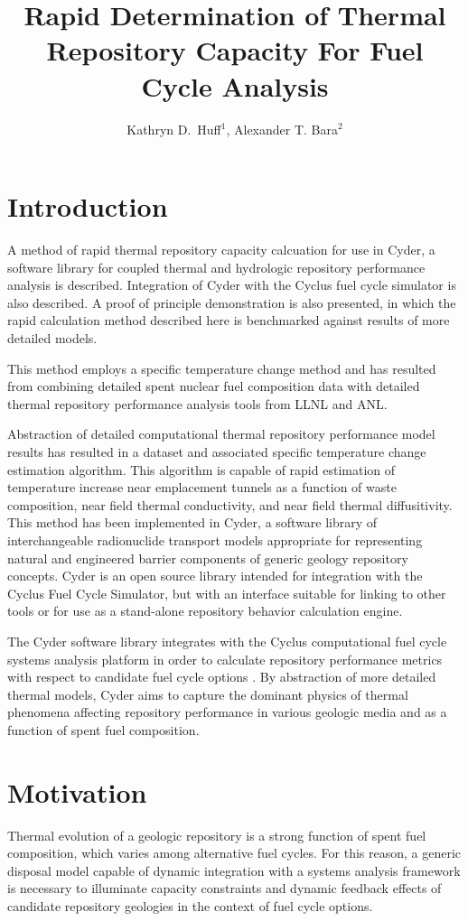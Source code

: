 \documentclass{anstrans}
\title{Rapid Determination of Thermal Repository Capacity For Fuel Cycle Analysis}
\author{Kathryn D.~Huff$^1$, Alexander T. Bara$^2$}
\institute{$^1$Univ. of Wisconsin, 1500 Engineering Dr., Madison, WI, 53706\\ 
\& Argonne National Laboratory, 9700 S. Cass Ave., Lemont, IL, khuff@anl.gov\\
$^2$Univ. of Illinois, Urbana Champaign, IL, 61801, bara1@illinois.edu}
\date{}
\begin{document}
\section{Introduction}

A method of rapid thermal repository capacity calcuation for use in Cyder, a 
software library for coupled thermal and hydrologic repository performance 
analysis is described. Integration of Cyder with the Cyclus fuel cycle simulator 
is also described. A proof of principle demonstration is also presented, in 
which the rapid calculation method described here is benchmarked against results 
of more detailed models.

This method employs a specific temperature change method \cite{radel} and has 
resulted from combining detailed spent nuclear fuel composition data with 
detailed thermal repository performance analysis 
tools from \gls{LLNL} and \gls{ANL}\cite{radel,llnl,sinda}.

Abstraction of detailed computational thermal repository performance model 
results has resulted in a dataset and associated specific temperature change 
estimation algorithm. This algorithm is capable of rapid estimation of temperature increase near 
emplacement tunnels as a function of waste composition, near field thermal 
conductivity, and near field thermal diffusitivity.  This method has been implemented in Cyder, 
a software library of interchangeable 
radionuclide transport models appropriate for representing natural and 
engineered barrier components of generic geology repository concepts.
Cyder is an open source library intended for integration with the 
Cyclus Fuel Cycle Simulator, but with an interface suitable for linking to other 
tools or for use as a stand-alone repository behavior calculation engine. 

The Cyder software library integrates with 
the Cyclus computational fuel cycle systems analysis platform in order to 
calculate repository performance metrics with respect to candidate fuel cycle 
options \cite{huff_cyder_2012,huff_cyclus:_2010}. By abstraction of more 
detailed thermal models, Cyder aims to capture the dominant 
physics of thermal phenomena affecting repository performance in 
various geologic media and as a function of spent fuel composition.

\section{Motivation}
Thermal evolution of a geologic repository is a strong function 
of spent fuel composition, which varies among alternative fuel cycles. For this 
reason, a generic disposal model capable of dynamic integration with a systems analysis 
framework is necessary to illuminate capacity constraints and dynamic 
feedback effects of candidate repository geologies in the context of fuel cycle options.
\end{document}
